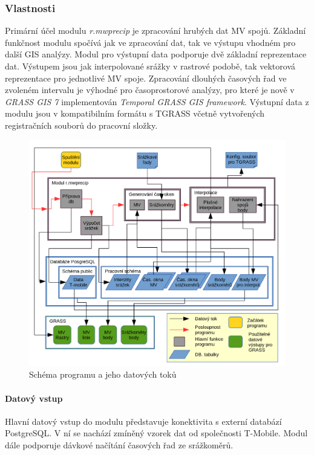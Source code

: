\documentclass[a4paper,12pt,oneside]{report}
\begin{document}
\subsubsection{Vlastnosti}
Primární účel modulu \textit{r.mwprecip} je zpracování hrubých dat MV
spojů. Základní funkčnost modulu spočívá jak ve zpracování dat, tak ve
výstupu vhodném pro další GIS analýzy. Modul pro výstupní data podporuje dvě
základní reprezentace dat. Výstupem jsou jak interpolované
srážky v rastrové podobě, tak vektorová reprezentace pro jednotlivé MV
spoje.  Zpracování dlouhých časových řad ve zvoleném intervalu je
výhodné pro časoprostorové analýzy, pro které je nově v \textit{GRASS
  GIS 7} implementován \textit{Temporal GRASS GIS framework}. Výstupní
data z modulu jsou v kompatibilním formátu s TGRASS včetně vytvořených
registračních souborů do pracovní složky.

\begin{figure}[h!]
    \centering
    \includegraphics[width=1\textwidth]{./img/grass/diagram.png}
    \caption[GUI modul]{Schéma programu a jeho datových toků  \centering  }
        \label{fig:baseline}
\end{figure}

\paragraph{Datový vstup}
Hlavní datový vstup do modulu představuje konektivita s externí 
databází PostgreSQL. V ní se nachází zmíněný vzorek dat od společnosti T-Mobile.
Modul dále podporuje dávkové načítání časových řad ze srážkoměrů.
\end{document}
